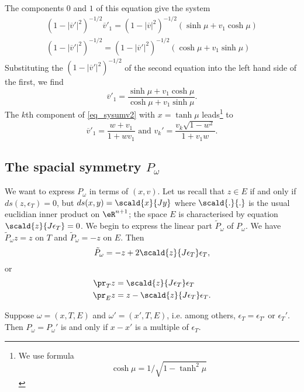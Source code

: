 The components $0$ and $1$ of this equation give the system
\begin{subequations}
\begin{align}
  (1-|\overline{v}'|^2)^{-1/2}\overline{v}'_1=(1-|\overline{v}|^2)^{-1/2}(\sinh\mu+v_1\cosh\mu)\\
 (1-|\overline{v}'|^2)^{-1/2}=(1-|\overline{v}'|^2)^{-1/2}(\cosh\mu+v_1\sinh\mu)
\end{align}
\end{subequations}
Substituting the $(1-|\overline{v}'|^2)^{-1/2}$ of the second equation into the left hand side of the first, we find
\[ 
  \overline{v}'_1=\frac{ \sinh\mu+v_1\cosh\mu }{ \cosh\mu+v_1\sinh\mu }.
\]
The $k$th component of \eqref{eq_sysumv2} with $x=\tanh\mu$ leads\footnote{We use formula 
\[\cosh\mu=1/\sqrt{1-\tanh^2\mu}\]} to
\[ 
  \overline{v}'_1=\frac{ w+v_1 }{ 1+wv_1 }\text{ and } v_k'=\frac{ v_k\sqrt{1-w^2} }{ 1+v_1w }.
\]


\subsection{The spacial symmetry \texorpdfstring{$P_{\omega}$}{P}}

We want to express $P_{\omega}$ in terms of $(x,v)$. Let us recall that $z\in E$ if and only if $ds(z,\epsilon_T)=0$, but $ds(x,y)=\scald{ x }{ Jy }$ where $\scald{ . }{ . }$ is the usual euclidian inner product on $\eR^{n+1}$; the space $E$ is characterised by equation $\scald{ z }{ J\epsilon_T }=0$. We begin to express the linear part $\tilde P_{\omega}$ of $P_{\omega}$. We have $\tilde P_{\omega}z=z$ on $T$ and $\tilde P_{\omega}=-z$ on $E$. Then
\begin{equation}
\tilde P_{\omega}=-z+2\scald{ z }{ J\epsilon_T }\epsilon_T,
\end{equation}
or 
\begin{subequations}
\begin{align}
  \pr_Tz&=\scald{ z }{ J\epsilon_T }\epsilon_T\\
 \pr_Ez&=z-\scald{ z }{ J\epsilon_T }\epsilon_T.
\end{align}
\end{subequations}

\begin{lemma}
Suppose $\omega=(x,T,E)$ and $\omega'=(x',T,E)$, i.e. among others, $\epsilon_T=\epsilon_{T'}$ or $\epsilon_{T}'$. Then $P_{\omega}=P_{\omega}'$ is and only if $x-x'$ is a multiple of $\epsilon_T$.
\end{lemma}

